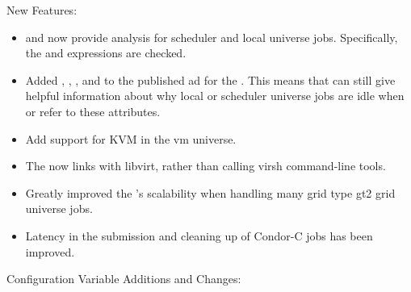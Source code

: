 \noindent New Features:

\begin{itemize}

\item {}  and  now provide
  analysis for scheduler and local universe jobs.  Specifically, the
   and
   expressions are checked.

\item Added , ,
, and 
to the published ad for the .  This means that
  can still give helpful information about
why local or scheduler universe jobs are idle when
 or
 refer to these attributes.

\item Add support for KVM in the vm universe.

\item The  now links with libvirt, rather than calling
virsh command-line tools.

\item Greatly improved the 's scalability when handling
many grid type gt2 grid universe jobs.

\item Latency in the submission and cleaning up of Condor-C jobs
has been improved.

\end{itemize}

\noindent Configuration Variable Additions and Changes:

